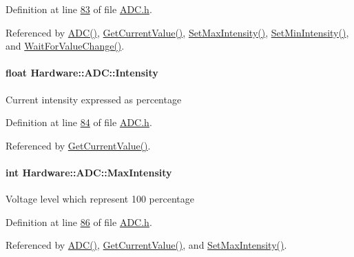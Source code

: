 Definition at line \hyperlink{_a_d_c_8h_source_l00083}{83} of file \hyperlink{_a_d_c_8h_source}{A\+D\+C.\+h}.



Referenced by \hyperlink{_a_d_c_8cpp_source_l00014}{A\+D\+C()}, \hyperlink{_a_d_c_8cpp_source_l00053}{Get\+Current\+Value()}, \hyperlink{_a_d_c_8cpp_source_l00065}{Set\+Max\+Intensity()}, \hyperlink{_a_d_c_8cpp_source_l00061}{Set\+Min\+Intensity()}, and \hyperlink{_a_d_c_8cpp_source_l00088}{Wait\+For\+Value\+Change()}.

\hypertarget{class_hardware_1_1_a_d_c_a38a0f00558a3de01b3bce567643dae4a}{}
\paragraph[{Intensity}]{\setlength{\rightskip}{0pt plus 5cm}float Hardware\+::\+A\+D\+C\+::\+Intensity\hspace{0.3cm}{\ttfamily [private]}}\label{class_hardware_1_1_a_d_c_a38a0f00558a3de01b3bce567643dae4a}
Current intensity expressed as percentage 

Definition at line \hyperlink{_a_d_c_8h_source_l00084}{84} of file \hyperlink{_a_d_c_8h_source}{A\+D\+C.\+h}.



Referenced by \hyperlink{_a_d_c_8cpp_source_l00053}{Get\+Current\+Value()}.

\hypertarget{class_hardware_1_1_a_d_c_a8fb4ac4b41ff54a44e57e9ce8bc5bd93}{}
\paragraph[{Max\+Intensity}]{\setlength{\rightskip}{0pt plus 5cm}int Hardware\+::\+A\+D\+C\+::\+Max\+Intensity\hspace{0.3cm}{\ttfamily [private]}}\label{class_hardware_1_1_a_d_c_a8fb4ac4b41ff54a44e57e9ce8bc5bd93}
Voltage level which represent 100 percentage 

Definition at line \hyperlink{_a_d_c_8h_source_l00086}{86} of file \hyperlink{_a_d_c_8h_source}{A\+D\+C.\+h}.



Referenced by \hyperlink{_a_d_c_8cpp_source_l00014}{A\+D\+C()}, \hyperlink{_a_d_c_8cpp_source_l00053}{Get\+Current\+Value()}, and \hyperlink{_a_d_c_8cpp_source_l00065}{Set\+Max\+Intensity()}.

